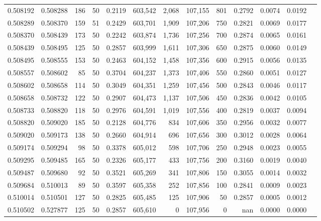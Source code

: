 \begin{tabular}{rrrrrrrrrrrrr}
0.508192 & 0.508288 & 186 &  50 &                                     0.2119 & 603,542 &   2,068 & 107,155 &     801 & 0.2792 & 0.0074 & 0.0192 \\
0.508289 & 0.508370 & 159 &  51 &                                     0.2429 & 603,701 &   1,909 & 107,206 &     750 & 0.2821 & 0.0069 & 0.0177 \\
0.508370 & 0.508439 & 173 &  50 &                                     0.2242 & 603,874 &   1,736 & 107,256 &     700 & 0.2874 & 0.0065 & 0.0161 \\
0.508439 & 0.508495 & 125 &  50 &                                     0.2857 & 603,999 &   1,611 & 107,306 &     650 & 0.2875 & 0.0060 & 0.0149 \\
0.508495 & 0.508555 & 153 &  50 &                                     0.2463 & 604,152 &   1,458 & 107,356 &     600 & 0.2915 & 0.0056 & 0.0135 \\
0.508557 & 0.508602 &  85 &  50 &                                     0.3704 & 604,237 &   1,373 & 107,406 &     550 & 0.2860 & 0.0051 & 0.0127 \\
0.508602 & 0.508658 & 114 &  50 &                                     0.3049 & 604,351 &   1,259 & 107,456 &     500 & 0.2843 & 0.0046 & 0.0117 \\
0.508658 & 0.508732 & 122 &  50 &                                     0.2907 & 604,473 &   1,137 & 107,506 &     450 & 0.2836 & 0.0042 & 0.0105 \\
0.508733 & 0.508820 & 118 &  50 &                                     0.2976 & 604,591 &   1,019 & 107,556 &     400 & 0.2819 & 0.0037 & 0.0094 \\
0.508820 & 0.509020 & 185 &  50 &                                     0.2128 & 604,776 &     834 & 107,606 &     350 & 0.2956 & 0.0032 & 0.0077 \\
0.509020 & 0.509173 & 138 &  50 &                                     0.2660 & 604,914 &     696 & 107,656 &     300 & 0.3012 & 0.0028 & 0.0064 \\
0.509174 & 0.509294 &  98 &  50 &                                     0.3378 & 605,012 &     598 & 107,706 &     250 & 0.2948 & 0.0023 & 0.0055 \\
0.509295 & 0.509485 & 165 &  50 &                                     0.2326 & 605,177 &     433 & 107,756 &     200 & 0.3160 & 0.0019 & 0.0040 \\
0.509487 & 0.509680 &  92 &  50 &                                     0.3521 & 605,269 &     341 & 107,806 &     150 & 0.3055 & 0.0014 & 0.0032 \\
0.509684 & 0.510013 &  89 &  50 &                                     0.3597 & 605,358 &     252 & 107,856 &     100 & 0.2841 & 0.0009 & 0.0023 \\
0.510014 & 0.510501 & 127 &  50 &                                     0.2825 & 605,485 &     125 & 107,906 &      50 & 0.2857 & 0.0005 & 0.0012 \\
0.510502 & 0.527877 & 125 &  50 &                                     0.2857 & 605,610 &       0 & 107,956 &       0 &    nan & 0.0000 & 0.0000 \\
\bottomrule
\end{tabular}

